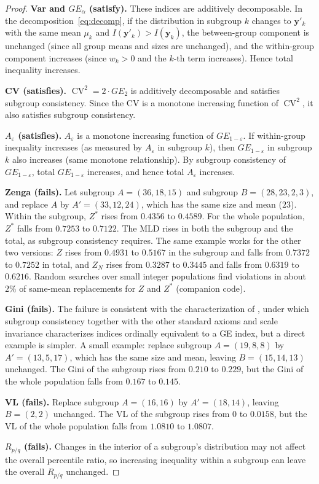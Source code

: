 \documentclass[12pt]{article}
\theoremstyle{plain}
\theoremstyle{definition}
\theoremstyle{remark}
\newcommand{\bfy}{\mathbf{y}}
\begin{document}
\begin{proof}
\textbf{Var and $GE_\alpha$ (satisfy).}
These indices are additively decomposable.
In the decomposition~\eqref{eq:decomp}, if the distribution in subgroup $k$ changes to $\bfy'_k$ with the same mean $\mu_k$ and $I(\bfy'_k) > I(\bfy_k)$, the between-group component is unchanged (since all group means and sizes are unchanged), and the within-group component increases (since $w_k > 0$ and the $k$-th term increases).
Hence total inequality increases.

\textbf{CV (satisfies).}
$\operatorname{CV}^2 = 2 \cdot GE_2$ is additively decomposable and satisfies subgroup consistency.
Since the CV is a monotone increasing function of $\operatorname{CV}^2$, it also satisfies subgroup consistency.

\textbf{$A_\varepsilon$ (satisfies).}
$A_\varepsilon$ is a monotone increasing function of $GE_{1-\varepsilon}$.
If within-group inequality increases (as measured by $A_\varepsilon$ in subgroup $k$), then $GE_{1-\varepsilon}$ in subgroup $k$ also increases (same monotone relationship).
By subgroup consistency of $GE_{1-\varepsilon}$, total $GE_{1-\varepsilon}$ increases, and hence total $A_\varepsilon$ increases.

\textbf{Zenga (fails).}
Let subgroup $A = (36, 18, 15)$ and subgroup $B = (28, 23, 2, 3)$, and replace $A$ by $A' = (33, 12, 24)$, which has the same size and mean ($23$).
Within the subgroup, $Z^*$ rises from $0.4356$ to $0.4589$.
For the whole population, $Z^*$ falls from $0.7253$ to $0.7122$.
The MLD rises in both the subgroup and the total, as subgroup consistency requires.
The same example works for the other two versions: $Z$ rises from $0.4931$ to $0.5167$ in the subgroup and falls from $0.7372$ to $0.7252$ in total, and $Z_N$ rises from $0.3287$ to $0.3445$ and falls from $0.6319$ to $0.6216$.
Random searches over small integer populations find violations in about $2\%$ of same-mean replacements for $Z$ and $Z^*$ (companion code).


\textbf{Gini (fails).}
The failure is consistent with the characterization of \citet{Shorrocks1988}, under which subgroup consistency together with the other standard axioms and scale invariance characterizes indices ordinally equivalent to a GE index, but a direct example is simpler.
A small example: replace subgroup $A = (19, 8, 8)$ by $A' = (13, 5, 17)$, which has the same size and mean, leaving $B = (15, 14, 13)$ unchanged.
The Gini of the subgroup rises from $0.210$ to $0.229$, but the Gini of the whole population falls from $0.167$ to $0.145$.

\textbf{VL (fails).}
Replace subgroup $A = (16, 16)$ by $A' = (18, 14)$, leaving $B = (2, 2)$ unchanged.
The VL of the subgroup rises from $0$ to $0.0158$, but the VL of the whole population falls from $1.0810$ to $1.0807$.

\textbf{$R_{p/q}$ (fails).}
Changes in the interior of a subgroup's distribution may not affect the overall percentile ratio, so increasing inequality within a subgroup can leave the overall $R_{p/q}$ unchanged.
\end{proof}
\end{document}
